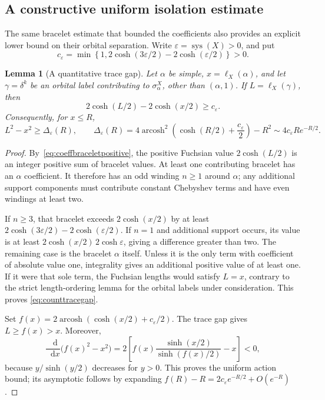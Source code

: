 \documentclass[11pt,a4paper]{article}
\numberwithin{equation}{section}
\newtheorem{lemma}[theorem]{Lemma}
\theoremstyle{definition}
\theoremstyle{remark}
\DeclareMathOperator{\arcosh}{arcosh}
\newcommand{\dd}{\mathop{}\!\mathrm d}
\begin{document}
\subsection{A constructive uniform isolation estimate}
\label{subsec:countuniformisolation}

The same bracelet estimate that bounded the coefficients also
provides an explicit lower bound on their orbital separation.
Write $\varepsilon=\operatorname{sys}(X)>0$, and put
\begin{equation}
 c_\varepsilon=\min\left\{1,
       2\cosh(3\varepsilon/2)-2\cosh(\varepsilon/2)\right\}>0.
 \label{eq:counttracegapconstant}
\end{equation}

\begin{lemma}[A quantitative trace gap]
\label{lem:counttracegap}
Let $\alpha$ be simple, $x=\ell_X(\alpha)$, and let
$\gamma=\delta^k$ be an orbital label contributing to
$\sigma_\alpha^X$, other than $(\alpha,1)$. If $L=\ell_X(\gamma)$,
then
\begin{equation}
 2\cosh(L/2)-2\cosh(x/2)\geq c_\varepsilon.
 \label{eq:counttracegap}
\end{equation}
Consequently, for $x\leq R$,
\begin{equation}
 L^2-x^2\geq\Delta_\varepsilon(R),\qquad
 \Delta_\varepsilon(R)=
 4\arcosh^2\!\left(\cosh(R/2)+\frac{c_\varepsilon}{2}\right)-R^2
 \sim4c_\varepsilon R e^{-R/2}.
 \label{eq:countactiongap}
\end{equation}
\end{lemma}

\begin{proof}
By~\eqref{eq:coeffbraceletpositive}, the positive Fuchsian value
$2\cosh(L/2)$ is an integer positive sum of bracelet values.
At least one contributing bracelet has an $\alpha$ coefficient.
It therefore has an odd winding $n\geq1$ around $\alpha$;
any additional support components must contribute constant
Chebyshev terms and have even windings at least two.

If $n\geq3$, that bracelet exceeds $2\cosh(x/2)$ by at least
$2\cosh(3\varepsilon/2)-2\cosh(\varepsilon/2)$.
If $n=1$ and additional support occurs, its value is at least
$2\cosh(x/2)\,2\cosh\varepsilon$, giving a difference greater
than two. The remaining case is the bracelet $\alpha$ itself.
Unless it is the only term with coefficient of absolute value one,
integrality gives an additional positive value of at least one.
If it were that sole term, the Fuchsian lengths would satisfy
$L=x$, contrary to the strict length-ordering lemma for the
orbital labels under consideration. This proves
\eqref{eq:counttracegap}.

Set $f(x)=2\arcosh(\cosh(x/2)+c_\varepsilon/2)$.
The trace gap gives $L\geq f(x)>x$. Moreover,
\[
 \frac{\dd}{\dd x}\bigl(f(x)^2-x^2\bigr)
 =2\left[f(x)\frac{\sinh(x/2)}{\sinh(f(x)/2)}-x\right]<0,
\]
because $y/\sinh(y/2)$ decreases for $y>0$.
This proves the uniform action bound; its asymptotic follows by
expanding $f(R)-R=2c_\varepsilon e^{-R/2}+O(e^{-R})$.
\end{proof}
\end{document}
